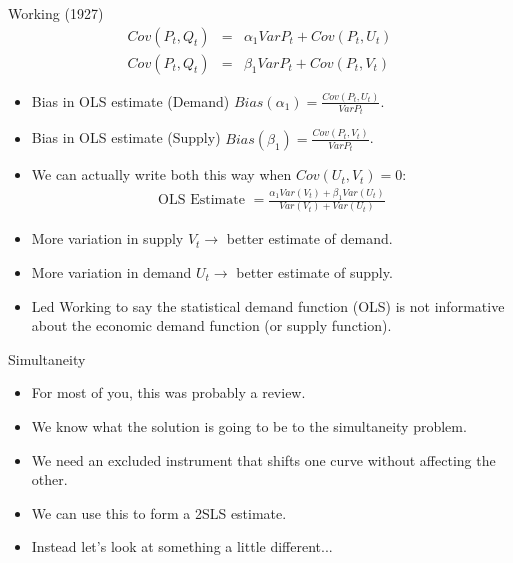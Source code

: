 \documentclass[xcolor=pdftex,dvipsnames,table,mathserif,aspectratio=169]{beamer}
\begin{document}
\begin{frame}{Working (1927)}
\small
\vspace{-0.2cm}
\begin{eqnarray*}
Cov(P_t, Q_t) &=& \alpha_1 Var P_t + Cov (P_t,U_t)\\
Cov(P_t, Q_t) &=& \beta_1 Var P_t + Cov (P_t,V_t)
\end{eqnarray*}
\vspace{-1cm}
\begin{itemize}
\item Bias in OLS estimate (Demand) $Bias(\alpha_1) = \frac{Cov(P_t,U_t)}{Var P_t}$.
\item Bias in OLS estimate (Supply) $Bias(\beta_1) = \frac{Cov(P_t,V_t)}{Var P_t}$.
\item We can actually write both this way when $Cov(U_t,V_t) = 0$:
\begin{eqnarray*}
\text{OLS Estimate }= \frac{\alpha_1 Var(V_t) + \beta_1 Var (U_t)}{Var (V_t) + Var (U_t)}
\end{eqnarray*}
\item More variation in supply $V_t \rightarrow$ better estimate of demand.
\item More variation in demand $U_t \rightarrow$ better estimate of supply.
\item Led Working to say the \alert{statistical demand function} (OLS) is not informative about the economic demand function (or supply function).
\end{itemize}
\end{frame}

\begin{frame}{Simultaneity}
\begin{itemize}
\item For most of you, this was probably a review.
\item We know what the solution is going to be to the simultaneity problem.
\item We need an \alert{excluded instrument} that shifts one curve without affecting the other.
\item We can use this to form a 2SLS estimate.
\item Instead let's look at something a little different...
\end{itemize}
\end{frame}
\end{document}
